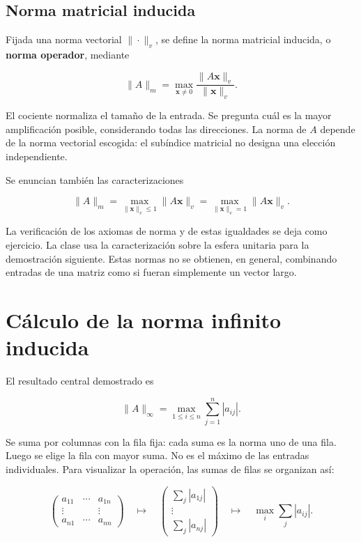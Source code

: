 \documentclass[12pt,a4paper]{article}
\begin{document}
\subsection{Norma matricial inducida}

Fijada una norma vectorial $\|\cdot\|_v$, se define la norma matricial inducida, o \textbf{norma operador}, mediante

\[
\boxed{\|A\|_m=\max_{\mathbf x\ne0}
\frac{\|A\mathbf x\|_v}{\|\mathbf x\|_v}}.
\]

El cociente normaliza el tamaño de la entrada. Se pregunta cuál es la mayor amplificación posible, considerando todas las direcciones. La norma de $A$ depende de la norma vectorial escogida: el subíndice matricial no designa una elección independiente.

Se enuncian también las caracterizaciones

\[
\|A\|_m=\max_{\|\mathbf x\|_v\le1}\|A\mathbf x\|_v
=\max_{\|\mathbf x\|_v=1}\|A\mathbf x\|_v.
\]

La verificación de los axiomas de norma y de estas igualdades se deja como ejercicio. La clase usa la caracterización sobre la esfera unitaria para la demostración siguiente. Estas normas no se obtienen, en general, combinando entradas de una matriz como si fueran simplemente un vector largo.

\section{Cálculo de la norma infinito inducida}

El resultado central demostrado es

\[
\boxed{\|A\|_\infty=\max_{1\le i\le n}\sum_{j=1}^n|a_{ij}|}.
\]

Se suma por columnas con la fila fija: cada suma es la norma uno de una fila. Luego se elige la fila con mayor suma. No es el máximo de las entradas individuales. Para visualizar la operación, las sumas de filas se organizan así:

\[
\begin{pmatrix}
a_{11}&\cdots&a_{1n}\\
\vdots&&\vdots\\
a_{n1}&\cdots&a_{nn}
\end{pmatrix}
\quad\longmapsto\quad
\begin{pmatrix}
\sum_j|a_{1j}|\\\vdots\\\sum_j|a_{nj}|
\end{pmatrix}
\quad\longmapsto\quad\max_i\sum_j|a_{ij}|.
\]
\end{document}

